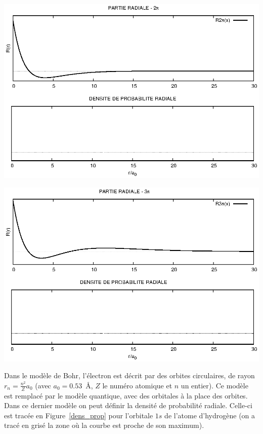 \begin{center}
\includegraphics[angle=90,width=\textwidth]{figure/rad2s.eps}
\end{center}
\clearpage

\begin{center}
\includegraphics[angle=90,width=\textwidth]{figure/rad3s.eps}
\end{center}
\clearpage


Dans le mod\`ele de Bohr, l'\'electron est d\'ecrit par des orbites circulaires, 
de rayon $r_n= \frac{n^2}{Z} a_0$ (avec $a_0=0.53$~\AA, $Z$ le num\'ero
atomique et $n$ un entier).
Ce mod\`ele est remplac\'e par le mod\`ele quantique, avec des orbitales \`a la place des orbites. Dans ce dernier
mod\`ele on peut d\'efinir la densit\'e de probabilit\'e radiale. Celle-ci est trac\'ee en Figure~\ref{dens_prop} 
pour l'orbitale 
$1s$ de l'atome d'hydrog\`ene (on a trac\'e en gris\'e la zone o\`u la courbe est proche de son maximum).

